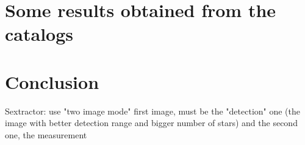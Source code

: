 \documentclass{aa}
\begin{document}
    \section{Some results obtained from the catalogs}\label{sec: Results}
    \section{Conclusion}\label{sec: Conclusion}
    
   Sextractor: use "two image mode" first image, must be the "detection" one (the image with better detection range and bigger number of stars) and the second one, the measurement

%
\nocite{*}


\end{document}
